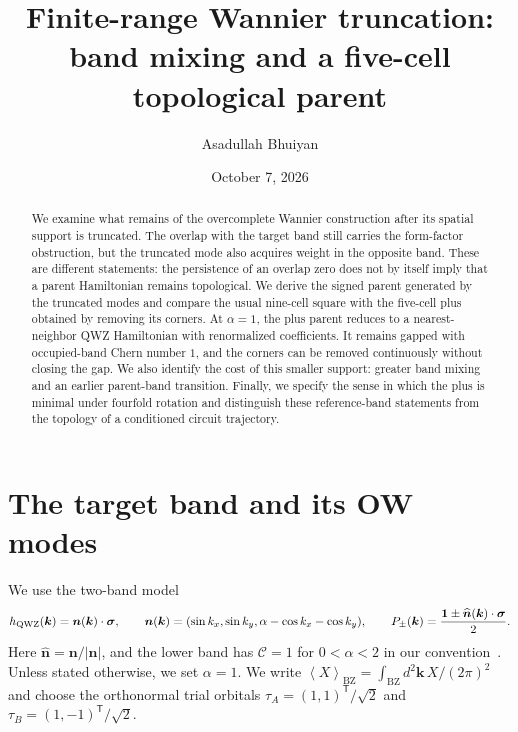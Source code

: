 \documentclass[aps,prb,onecolumn,nofootinbib,superscriptaddress]{revtex4-2}
\newcommand{\bk}{\boldsymbol{k}}
\newcommand{\Id}{\mathbf{1}}
\newcommand{\BZ}{\mathrm{BZ}}
\newcommand{\Chern}{\mathcal{C}}
\newcommand{\avg}[1]{\left\langle #1\right\rangle_{\BZ}}
\begin{document}
\title{Finite-range Wannier truncation: band mixing and a five-cell topological parent}
\author{Asadullah Bhuiyan}
\date{October 7, 2026}
\begin{abstract}
We examine what remains of the overcomplete Wannier construction after its spatial support is truncated. The overlap with the target band still carries the form-factor obstruction, but the truncated mode also acquires weight in the opposite band. These are different statements: the persistence of an overlap zero does not by itself imply that a parent Hamiltonian remains topological. We derive the signed parent generated by the truncated modes and compare the usual nine-cell square with the five-cell plus obtained by removing its corners. At $\alpha=1$, the plus parent reduces to a nearest-neighbor QWZ Hamiltonian with renormalized coefficients. It remains gapped with occupied-band Chern number $1$, and the corners can be removed continuously without closing the gap. We also identify the cost of this smaller support: greater band mixing and an earlier parent-band transition. Finally, we specify the sense in which the plus is minimal under fourfold rotation and distinguish these reference-band statements from the topology of a conditioned circuit trajectory.
\end{abstract}
\maketitle
\setcounter{tocdepth}{2}
\tableofcontents

\section{The target band and its OW modes}

We use the two-band model
\begin{equation}
 h_{\rm QWZ}(\bk)=\boldsymbol{n}(\bk)\cdot\boldsymbol{\sigma},
 \qquad \boldsymbol{n}(\bk)=(\sin k_x,\sin k_y,\alpha-\cos k_x-\cos k_y),
 \qquad P_\pm(\bk)=\frac{\Id\pm\widehat{\boldsymbol{n}}(\bk)\cdot\boldsymbol{\sigma}}{2}.
 \label{eq:model}
\end{equation}
Here $\widehat{\boldsymbol{n}}=\boldsymbol{n}/|\boldsymbol{n}|$, and the lower band has $\Chern=1$ for $0<\alpha<2$ in our convention~\cite{Qi2006}. Unless stated otherwise, we set $\alpha=1$. We write $\avg{X}=\int_{\BZ}d^2\bk\,X/(2\pi)^2$ and choose the orthonormal trial orbitals $\tau_A=(1,1)^{\mathsf T}/\sqrt{2}$ and $\tau_B=(1,-1)^{\mathsf T}/\sqrt{2}$.
\end{document}
